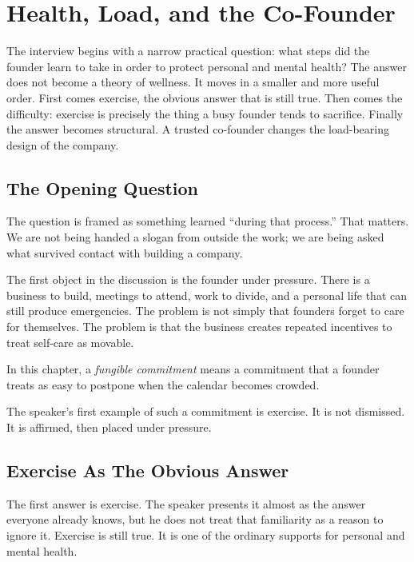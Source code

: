 \chapter{Health, Load, and the Co-Founder}

The interview begins with a narrow practical question: what steps did the founder learn to take in order to protect personal and mental health? The answer does not become a theory of wellness. It moves in a smaller and more useful order. First comes exercise, the obvious answer that is still true. Then comes the difficulty: exercise is precisely the thing a busy founder tends to sacrifice. Finally the answer becomes structural. A trusted co-founder changes the load-bearing design of the company.

\section{The Opening Question}

The question is framed as something learned ``during that process.'' That matters. We are not being handed a slogan from outside the work; we are being asked what survived contact with building a company.

The first object in the discussion is the founder under pressure. There is a business to build, meetings to attend, work to divide, and a personal life that can still produce emergencies. The problem is not simply that founders forget to care for themselves. The problem is that the business creates repeated incentives to treat self-care as movable.

\begin{definition}
In this chapter, a \emph{fungible commitment} means a commitment that a founder treats as easy to postpone when the calendar becomes crowded.
\end{definition}

The speaker's first example of such a commitment is exercise. It is not dismissed. It is affirmed, then placed under pressure.

\section{Exercise As The Obvious Answer}

The first answer is exercise. The speaker presents it almost as the answer everyone already knows, but he does not treat that familiarity as a reason to ignore it. Exercise is still true. It is one of the ordinary supports for personal and mental health.

